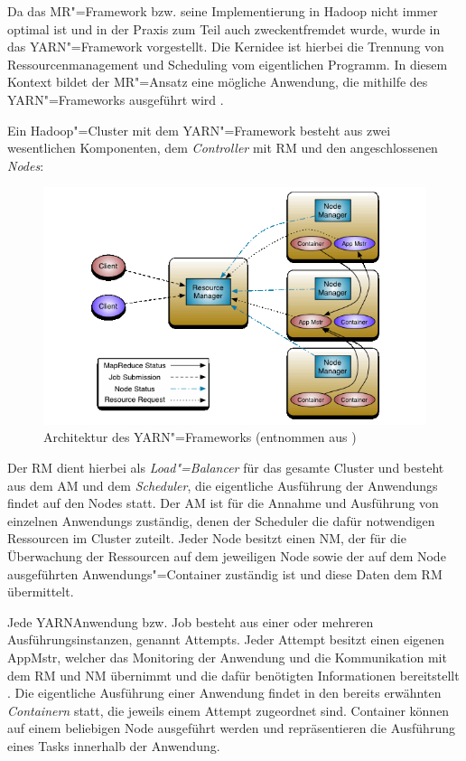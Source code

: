 Da das \gls{MR}"=Framework bzw. seine Implementierung in Hadoop nicht immer optimal ist und in der Praxis zum Teil auch zweckentfremdet wurde, wurde in \cite{Vavilapalli2013} das \gls{YARN}"=Framework vorgestellt.
Die Kernidee ist hierbei die Trennung von Ressourcenmanagement und Scheduling vom eigentlichen Programm.
In diesem Kontext bildet der \gls{MR}"=Ansatz eine mögliche Anwendung, die mithilfe des \gls{YARN}"=Frameworks ausgeführt wird \cite{Vavilapalli2013}.

Ein Hadoop"=Cluster mit dem \gls{YARN}"=Framework besteht aus zwei wesentlichen Komponenten, dem \emph{Controller} mit \gls{RM} und den angeschlossenen \emph{Nodes}:

\begin{figure}[h]
    \includegraphics{./resources/yarn_architecture.png}
    \caption[Architektur des YARN"=Frameworks]
    {Architektur des \gls{YARN}"=Frameworks (entnommen aus \cite{HadoopYarnArch271})}
    \label{fig:yarnarch}
\end{figure}

Der \gls{RM} dient hierbei als \emph{Load"=Balancer} für das gesamte Cluster und besteht aus dem \gls{AM} und dem \emph{Scheduler}, die eigentliche Ausführung der \glspl{Anwendung} findet auf den Nodes statt.
Der \gls{AM} ist für die Annahme und Ausführung von einzelnen \glspl{Anwendung} zuständig, denen der Scheduler die dafür notwendigen Ressourcen im Cluster zuteilt.
Jeder Node besitzt einen \gls{NM}, der für die Überwachung der Ressourcen auf dem jeweiligen Node sowie der auf dem Node ausgeführten Anwendungs"=Container zuständig ist und diese Daten dem \gls{RM} übermittelt.

Jede \gls{YARN}\gls{Anwendung} bzw. Job besteht aus einer oder mehreren Ausführungsinstanzen, genannt Attempts.
Jeder \gls{Attempt} besitzt einen eigenen \gls{AppMstr}, welcher das Monitoring der \gls{Anwendung} und die Kommunikation mit dem \gls{RM} und \gls{NM} übernimmt und die dafür benötigten Informationen bereitstellt \cite{HadoopYarnArch271}.
Die eigentliche Ausführung einer \gls{Anwendung} findet in den bereits erwähnten \emph{Containern} statt, die jeweils einem \gls{Attempt} zugeordnet sind.
Container können auf einem beliebigen Node ausgeführt werden und repräsentieren die Ausführung eines Tasks innerhalb der Anwendung.

